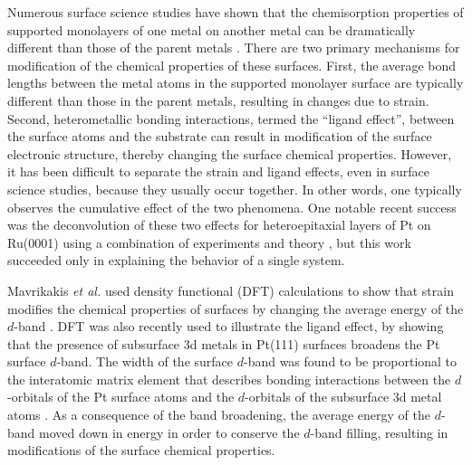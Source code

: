 \documentclass[aps,prl,twocolumn,superscriptaddress,showkeys]{revtex4}
\begin{document}
\maketitle

Numerous surface science studies have shown that the chemisorption
properties of supported monolayers of one metal on another metal can
be dramatically different than those of the parent metals
\cite{goodman1990:_chemis,campbell1992:_chemic,rodriguez1992}. There
are two primary mechanisms for modification of the chemical properties
of these surfaces. First, the average bond lengths between the metal
atoms in the supported monolayer surface are typically different than
those in the parent metals, resulting in changes due to strain.
Second, heterometallic bonding interactions, termed the ``ligand
effect'', between the surface atoms and the substrate can result in
modification of the surface electronic structure, thereby changing the
surface chemical properties.  However, it has been difficult to
separate the strain and ligand effects, even in surface science
studies, because they usually occur together. In other words, one
typically observes the cumulative effect of the two phenomena.  One
notable recent success was the deconvolution of these two effects for
heteroepitaxial layers of Pt on Ru(0001) using a combination of
experiments and theory
\cite{schlapka2003:_surfac_strain_subst_inter_heter_metal_layer}, but
this work succeeded only in explaining the behavior of a single
system.


Mavrikakis \emph{et al.} used density functional (DFT) calculations to show
that strain modifies the chemical properties of surfaces by changing
the average energy of the $d$-band
\cite{mavrikakis1998:_effec_strain_metal}. DFT was also recently used
to illustrate the ligand effect, by showing that the presence of
subsurface 3d metals in Pt(111) surfaces broadens the Pt surface
$d$-band.  The width of the surface $d$-band was found to be proportional
to the interatomic matrix element that describes bonding interactions
between the $d$-orbitals of the Pt surface atoms and the $d$-orbitals of
the subsurface 3d metal atoms
\cite{kitchin2004:_modif_surfac_elect_chemic_proper}. As a consequence
of the band broadening, the average energy of the $d$-band moved down in
energy in order to conserve the $d$-band filling, resulting in
modifications of the surface chemical properties.
\end{document}
